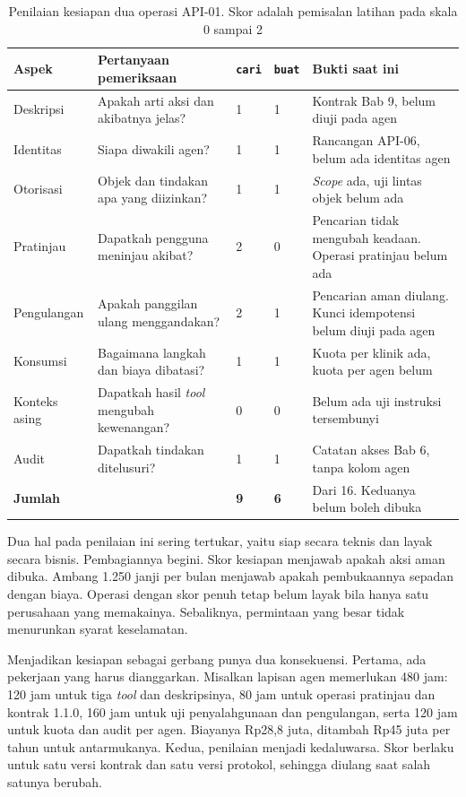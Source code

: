 \begin{table}[!htb]
  \centering
  \caption{Penilaian kesiapan dua operasi API-01. Skor adalah pemisalan latihan pada skala 0 sampai 2}
  \label{tab:ch14-kesiapan}
  \footnotesize
  \begin{tabularx}{\textwidth}{H{1.9cm}GH{1.15cm}H{1.15cm}G}
    \hline
    \textbf{Aspek} & \textbf{Pertanyaan pemeriksaan} & \textbf{\texttt{cari}} & \textbf{\texttt{buat}} & \textbf{Bukti saat ini} \\ \hline
    Deskripsi & Apakah arti aksi dan akibatnya jelas? & 1 & 1 & Kontrak Bab 9, belum diuji pada agen \\ \hline
    Identitas & Siapa diwakili agen? & 1 & 1 & Rancangan API-06, belum ada identitas agen \\ \hline
    Otorisasi & Objek dan tindakan apa yang diizinkan? & 1 & 1 & \textit{Scope} ada, uji lintas objek belum ada \\ \hline
    Pratinjau & Dapatkah pengguna meninjau akibat? & 2 & 0 & Pencarian tidak mengubah keadaan. Operasi pratinjau belum ada \\ \hline
    Pengulangan & Apakah panggilan ulang menggandakan? & 2 & 1 & Pencarian aman diulang. Kunci idempotensi belum diuji pada agen \\ \hline
    Konsumsi & Bagaimana langkah dan biaya dibatasi? & 1 & 1 & Kuota per klinik ada, kuota per agen belum \\ \hline
    Konteks asing & Dapatkah hasil \textit{tool} mengubah kewenangan? & 0 & 0 & Belum ada uji instruksi tersembunyi \\ \hline
    Audit & Dapatkah tindakan ditelusuri? & 1 & 1 & Catatan akses Bab 6, tanpa kolom agen \\ \hline
    \textbf{Jumlah} & & \textbf{9} & \textbf{6} & Dari 16. Keduanya belum boleh dibuka \\ \hline
  \end{tabularx}
\end{table}

Dua hal pada penilaian ini sering tertukar, yaitu siap secara teknis dan layak secara bisnis. Pembagiannya begini. Skor kesiapan menjawab apakah aksi aman dibuka. Ambang 1.250 janji per bulan menjawab apakah pembukaannya sepadan dengan biaya. Operasi dengan skor penuh
tetap belum layak bila hanya satu perusahaan yang memakainya. Sebaliknya, permintaan yang besar tidak menurunkan syarat keselamatan.

Menjadikan kesiapan sebagai gerbang punya dua konsekuensi. Pertama, ada pekerjaan yang harus dianggarkan. Misalkan lapisan agen memerlukan 480 jam: 120 jam untuk tiga \textit{tool} dan deskripsinya, 80 jam untuk operasi pratinjau dan kontrak 1.1.0, 160 jam untuk uji penyalahgunaan dan pengulangan,
serta 120 jam untuk kuota dan audit per agen. Biayanya Rp28,8 juta, ditambah Rp45 juta per tahun untuk antarmukanya. Kedua, penilaian menjadi kedaluwarsa. Skor berlaku untuk satu versi kontrak dan satu versi protokol, sehingga diulang saat salah satunya berubah.

